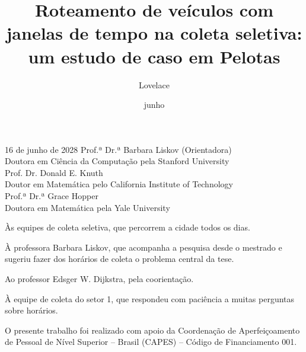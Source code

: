 \documentclass[eq,capa]{texufpel}
\title{Roteamento de veículos com janelas de tempo na coleta seletiva: um estudo de caso em Pelotas}
\author{Lovelace}{Ada}                          %
\date{junho}{2028}
\begin{document}
\renewcommand{\advisorname}{Orientadora}

\maketitle   %


\begin{aprovacao}{16 de junho de 2028}
\noindent Prof.ª Dr.ª Barbara Liskov (Orientadora)\\
Doutora em Ciência da Computação pela Stanford University\\[1cm]

\noindent Prof. Dr. Donald E. Knuth\\
Doutor em Matemática pelo California Institute of Technology\\[1cm]

\noindent Prof.ª Dr.ª Grace Hopper\\
Doutora em Matemática pela Yale University
\end{aprovacao}

\begin{dedicatoria}
Às equipes de coleta seletiva, que percorrem a cidade todos os dias.
\end{dedicatoria}

\begin{agradecimentos}
À professora Barbara Liskov, que acompanha a pesquisa desde o mestrado e
sugeriu fazer dos horários de coleta o problema central da tese.

Ao professor Edsger W. Dijkstra, pela coorientação.

À equipe de coleta do setor 1, que respondeu com paciência a muitas perguntas
sobre horários.

O presente trabalho foi realizado com apoio da Coordenação de Aperfeiçoamento
de Pessoal de Nível Superior -- Brasil (CAPES) -- Código de Financiamento 001.
\end{agradecimentos}
\end{document}
